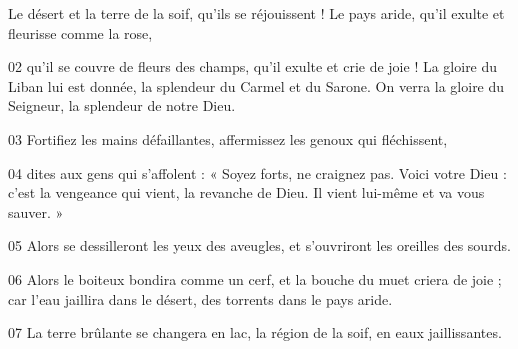 Le désert et la terre de la soif, qu’ils se réjouissent ! Le pays aride, qu’il exulte et fleurisse comme la rose,

02 qu’il se couvre de fleurs des champs, qu’il exulte et crie de joie ! La gloire du Liban lui est donnée, la splendeur du Carmel et du Sarone. On verra la gloire du Seigneur, la splendeur de notre Dieu.

03 Fortifiez les mains défaillantes, affermissez les genoux qui fléchissent,

04 dites aux gens qui s’affolent : « Soyez forts, ne craignez pas. Voici votre Dieu : c’est la vengeance qui vient, la revanche de Dieu. Il vient lui-même et va vous sauver. »

05 Alors se dessilleront les yeux des aveugles, et s’ouvriront les oreilles des sourds.

06 Alors le boiteux bondira comme un cerf, et la bouche du muet criera de joie ; car l’eau jaillira dans le désert, des torrents dans le pays aride.

07 La terre brûlante se changera en lac, la région de la soif, en eaux jaillissantes. 